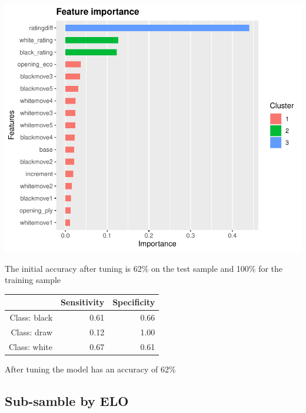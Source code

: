 \documentclass[12pt,preprint, authoryear]{elsarticle}
\let\origfigure\figure
\let\endorigfigure\endfigure
\renewenvironment{figure}[1][2] {
    \expandafter\origfigure\expandafter[H]
} {
    \endorigfigure
}
\let\origtable\table
\let\endorigtable\endtable
\renewenvironment{table}[1][2] {
    \expandafter\origtable\expandafter[H]
} {
    \endorigtable
}
\numberwithin{equation}{section}
\numberwithin{figure}{section}
\numberwithin{table}{section}
\begin{document}
\begin{figure}[H]

{\centering \includegraphics{WriteUp_files/figure-latex/importfullsamp2-1} 

}

\caption{Importance of Features for Tuned Model: Full Sample\label{Figure9}}\label{fig:importfullsamp2}
\end{figure}

The initial accuracy after tuning is 62\% on the test sample and 100\%
for the training sample

\begin{table}[ht]
\centering
\begin{tabular}{rrr}
  \hline
 & Sensitivity & Specificity \\ 
  \hline
Class: black & 0.61 & 0.66 \\ 
  Class: draw & 0.12 & 1.00 \\ 
  Class: white & 0.67 & 0.61 \\ 
   \hline
\end{tabular}
\caption{Accuracy Full Sample: Tuned Model} 
\end{table}

After tuning the model has an accuracy of 62\%

\hypertarget{sub-samble-by-elo}{%
\subsection{Sub-samble by ELO}\label{sub-samble-by-elo}}
\end{document}
